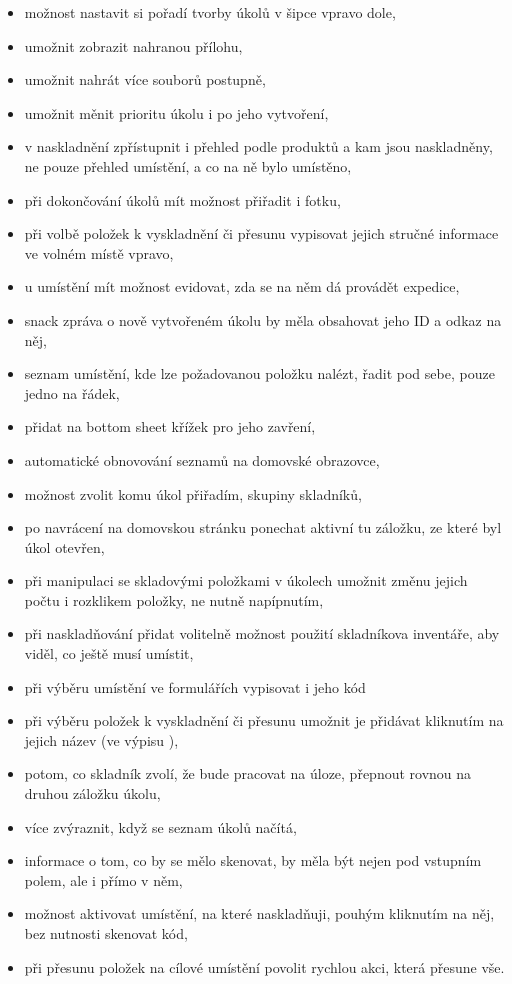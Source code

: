 \begin{itemize}
	\item možnost nastavit si pořadí tvorby úkolů v šipce vpravo dole,
	\item umožnit zobrazit nahranou přílohu,
	\item umožnit nahrát více souborů postupně,
	\item umožnit měnit prioritu úkolu i po jeho vytvoření,
	\item v naskladnění zpřístupnit i přehled podle produktů a kam jsou naskladněny, ne pouze přehled umístění, a co na ně bylo umístěno,
	\item při dokončování úkolů mít možnost přiřadit i fotku,
	\item při volbě položek k vyskladnění či přesunu vypisovat jejich stručné informace ve volném místě vpravo,
	\item u umístění mít možnost evidovat, zda se na něm dá provádět expedice,
	\item snack zpráva o nově vytvořeném úkolu by měla obsahovat jeho ID a odkaz na něj,
	\item seznam umístění, kde lze požadovanou položku nalézt, řadit pod sebe, pouze jedno na řádek,
	\item přidat na bottom sheet křížek pro jeho zavření,
	\item automatické obnovování seznamů na domovské obrazovce,
	\item možnost zvolit komu úkol přiřadím, skupiny skladníků,
	\item po navrácení na domovskou stránku ponechat aktivní tu záložku, ze které byl úkol otevřen,
	\item při manipulaci se skladovými položkami v úkolech umožnit změnu jejich počtu i rozklikem položky, ne nutně napípnutím,
	\item při naskladňování přidat volitelně možnost použití skladníkova inventáře, aby viděl, co ještě musí umístit,
	\item při výběru umístění ve formulářích vypisovat i jeho kód
	\item při výběru položek k vyskladnění či přesunu umožnit je přidávat kliknutím na jejich název (ve výpisu ),
	\item potom, co skladník zvolí, že bude pracovat na úloze, přepnout rovnou na druhou záložku úkolu,
	\item více zvýraznit, když se seznam úkolů načítá,
	\item informace o tom, co by se mělo skenovat, by měla být nejen pod vstupním polem, ale i přímo v něm,
	\item možnost aktivovat umístění, na které naskladňuji, pouhým kliknutím na něj, bez nutnosti skenovat kód,
	\item při přesunu položek na cílové umístění povolit rychlou akci, která přesune vše.
\end{itemize}

